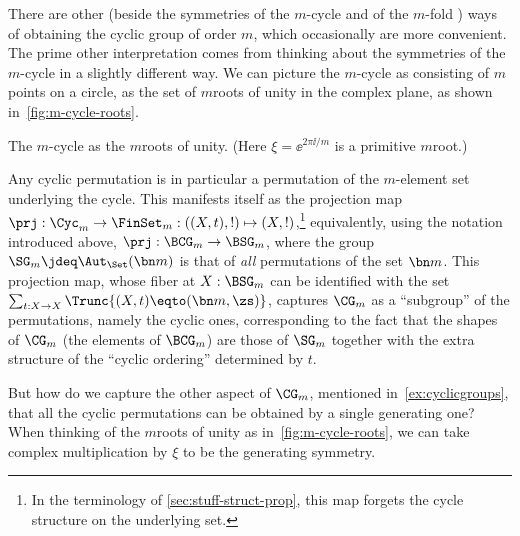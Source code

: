 \begin{example}
\label{ex:Cm}
There are other (beside the symmetries of the $m$-cycle and of the $m$-fold \covering) ways of obtaining the cyclic group of order $m$, which occasionally are more convenient.
The prime other interpretation comes from thinking about the symmetries of the $m$-cycle in a slightly different way.
We can picture the $m$-cycle as consisting of $m$ points on a circle,
\eg as the set of $m$\th roots of unity in the complex plane, as shown in~\cref{fig:m-cycle-roots}.
\begin{marginfigure}
  \caption{The $m$-cycle as the $m$\th roots of unity.
    (Here $\xi=\ee^{2\pi\ii/m}$ is a primitive $m$\th root.)}
  \label{fig:m-cycle-roots}
\end{marginfigure}
Any cyclic permutation is in particular a permutation 
of the $m$-element set underlying the cycle.
This manifests itself as the projection map 
$\prj : \Cyc_m \to \FinSet_m : ((X,t),!) \mapsto (X,!)$,\footnote{%
  In the terminology of \cref{sec:stuff-struct-prop},
  this map forgets the cycle structure on the underlying set.}
equivalently, using the notation introduced above, $\prj : \BCG_m \to \BSG_m$,
where the group $\SG_m\jdeq\Aut_\Set(\bn m)$ is that of
\emph{all} permutations of the set $\bn m$.
This projection map,
whose fiber at $X : \BSG_m$ can be identified with
the set $\sum_{t:X\to X}\Trunc{(X,t)\eqto(\bn m,\zs)}$,
captures $\CG_m$ as a ``subgroup'' of the permutations, 
namely the cyclic ones, corresponding to the fact that the 
shapes of $\CG_m$ (\ie the elements of $\BCG_m$)
are those of $\SG_m$ together with the extra structure of 
the ``cyclic ordering'' determined by $t$.

But how do we capture the other aspect of $\CG_m$,
mentioned in~\cref{ex:cyclicgroups},
that all the cyclic permutations can be obtained by a single generating one?
When thinking of the $m$\th roots of unity as in~\cref{fig:m-cycle-roots},
we can take complex multiplication by $\xi$ to be the generating symmetry.


\end{example}
